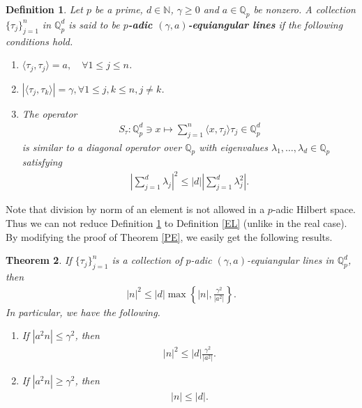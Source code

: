 \documentclass{amsart}
\newtheorem{theorem}{Theorem}[section]
\newtheorem{definition}[theorem]{Definition}
\begin{document}
\begin{definition}\label{A}
	Let $p$ be a prime, $d \in \mathbb{N}$, $\gamma \geq0$ and $a\in \mathbb{Q}_p$ be nonzero. A collection $\{\tau_j\}_{j=1}^n$  in $\mathbb{Q}_p^d$	is said to be \textbf{$p$-adic $(\gamma,a)$-equiangular  lines} if the following conditions hold.
\begin{enumerate}[\upshape(i)]
	\item $\langle \tau_j, \tau_j\rangle =a, \quad \forall 1\leq j \leq n$.
	\item $	|\langle \tau_j, \tau_k\rangle| =\gamma, \forall 1\leq j, k \leq n, j \neq k$.
	\item The operator 
	\begin{align*}
		S_\tau : \mathbb{Q}_p^d\ni x \mapsto \sum_{j=1}^n\langle x, \tau_j\rangle \tau_j \in \mathbb{Q}_p^d
	\end{align*}
	is similar  to a diagonal operator over $\mathbb{Q}_p$  with eigenvalues $\lambda_1, \dots, \lambda_d \in \mathbb{Q}_p$ satisfying 
	\begin{align*}
		\left|\sum_{j=1}^{d}\lambda_j\right|^2\leq |d| \left|\sum_{j=1}^{d}\lambda_j^2\right|.	
	\end{align*}
\end{enumerate}	
\end{definition}
Note that division by norm of an element is not allowed in a $p$-adic Hilbert space. 
Thus we can not  reduce Definition \ref{A} to Definition \ref{EL} (unlike in the real case). 
By modifying the proof of Theorem \ref{PE}, we easily get the following results. 
\begin{theorem}
	 If $\{\tau_j\}_{j=1}^n$  is a collection of $p$-adic  $(\gamma,a)$-equiangular lines in $\mathbb{Q}^d_p$, then 
	\begin{align*}
		|n|^2\leq |d|\max\left\{|n|, \frac{\gamma^2}{|a^2|} \right\}.
	\end{align*}
	In particular, we have the following. 
	\begin{enumerate}[\upshape(i)]
		\item If $|a^2n|\leq \gamma^2$, then 
		\begin{align*}
			|n|^2\leq |d|\frac{\gamma^2}{|a^2|}.
		\end{align*}
		\item If $|a^2n|\geq \gamma^2$, then 
		\begin{align*}
			|n|\leq |d|.
		\end{align*}
	\end{enumerate}
\end{theorem}
\end{document}
